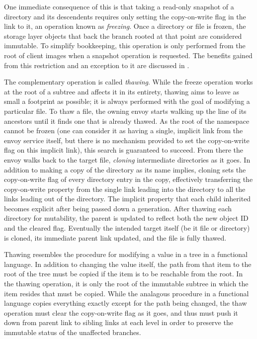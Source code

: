 One immediate consequence of this is that taking a read-only snapshot of a directory and its descendents requires only setting the copy-on-write flag in the link to it, an operation known as \emph{freezing}. Once a directory or file is frozen, the storage layer objects that back the branch rooted at that point are considered immutable. To simplify bookkeeping, this operation is only performed from the root of client images when a snapshot operation is requested. The benefits gained from this restriction and an exception to it are discussed in .

The complementary operation is called \emph{thawing}. While the freeze operation works at the root of a subtree and affects it in its entirety, thawing aims to leave as small a footprint as possible; it is always performed with the goal of modifying a particular file. To thaw a file, the owning envoy starts walking up the line of its ancestors until it finds one that is already thawed. As the root of the namespace cannot be frozen (one can consider it as having a single, implicit link from the envoy service itself, but there is no mechanism provided to set the copy-on-write flag on this implicit link), this search is guaranteed to succeed. From there the envoy walks back to the target file, \emph{cloning} intermediate directories as it goes. In addition to making a copy of the directory as its name implies, cloning sets the copy-on-write flag of every directory entry in the copy, effectively transferring the copy-on-write property from the single link leading into the directory to all the links leading out of the directory. The implicit property that each child inherited becomes explicit after being passed down a generation. After thawing each directory for mutability, the parent is updated to reflect both the new object ID and the cleared flag. Eventually the intended target itself (be it file or directory) is cloned, its immediate parent link updated, and the file is fully thawed.

Thawing resembles the procedure for modifying a value in a tree in a functional language. In addition to changing the value itself, the path from that item to the root of the tree must be copied if the item is to be reachable from the root. In the thawing operation, it is only the root of the immutable subtree in which the item resides that must be copied. While the analagous procedure in a functional language copies everything exactly except for the path being changed, the thaw operation must clear the copy-on-write flag as it goes, and thus must push it down from parent link to sibling links at each level in order to preserve the immutable status of the unaffected branches.

